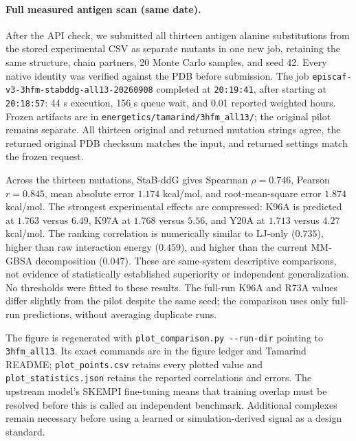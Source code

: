 \paragraph{Full measured antigen scan (same date).}
After the API check, we submitted all thirteen antigen alanine substitutions from the stored
experimental CSV as separate mutants in one new job, retaining the same structure, chain
partners, 20 Monte Carlo samples, and seed 42. Every native identity was verified against the
PDB before submission. The job \texttt{episcaf-v3-3hfm-stabddg-all13-20260908} completed at
\texttt{20:19:41}, after starting at \texttt{20:18:57}: 44 s execution, 156 s queue wait,
and 0.01 reported weighted hours. Frozen artifacts are in
\texttt{energetics/tamarind/3hfm\_all13/}; the original pilot remains separate.
All thirteen original and returned mutation strings agree, the returned original PDB checksum
matches the input, and returned settings match the frozen request.

Across the thirteen mutations, StaB-ddG gives Spearman $\rho=0.746$, Pearson $r=0.845$,
mean absolute error $1.174$ kcal/mol, and root-mean-square error $1.874$ kcal/mol.
The strongest experimental effects are compressed: K96A is predicted at $1.763$ versus $6.49$,
K97A at $1.768$ versus $5.56$, and Y20A at $1.713$ versus $4.27$ kcal/mol.
The ranking correlation is numerically similar to LJ-only ($0.735$), higher than raw interaction
energy ($0.459$), and higher than the current MM-GBSA decomposition ($0.047$). These are
same-system descriptive comparisons, not evidence of statistically established superiority
or independent generalization. No thresholds were fitted to these results.
The full-run K96A and R73A values differ slightly from the pilot despite the same seed; the
comparison uses only full-run predictions, without averaging duplicate runs.

\begin{table}[htbp]
\centering

\caption{Full measured antigen alanine scan. Units are kcal/mol. Generated from the separate
full-run archive and experimental CSV by \texttt{report\_pilot.py}, using
\texttt{-{}-run-dir} for \texttt{3hfm\_all13} and
\texttt{-{}-table-name tamarind\_all13\_table.tex}.}
\label{tab:tamarind_all13}
\end{table}

The figure is regenerated with \texttt{plot\_comparison.py -{}-run-dir} pointing to
\texttt{3hfm\_all13}. Its exact commands are in the figure ledger and Tamarind README;
\texttt{plot\_points.csv} retains every plotted value and \texttt{plot\_statistics.json}
retains the reported correlations and errors. The upstream model's SKEMPI fine-tuning means
that training overlap must be resolved before this is called an independent benchmark.
Additional complexes remain necessary before using a learned or simulation-derived signal
as a design standard.

